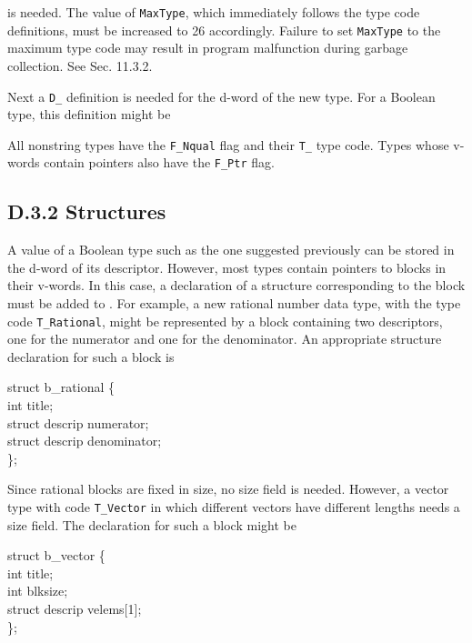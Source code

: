 \noindent is needed. The value of \texttt{MaxType}, which immediately follows
the type code definitions, must be increased to 26 accordingly.
Failure to set \texttt{MaxType} to the maximum type code may result in
program malfunction during garbage collection. See Sec. 11.3.2.

Next a \texttt{D\_} definition is needed for the d-word of the new type.
For a Boolean type, this definition might be


\noindent
All nonstring types have the \texttt{F\_Nqual} flag and their \texttt{T\_}
type code. Types whose v-words contain pointers also have the
\texttt{F\_Ptr} flag.

\subsection[D.3.2 Structures]{D.3.2 Structures}

A value of a Boolean type such as the one suggested previously can be
stored in the d-word of its descriptor. However, most types contain
pointers to blocks in their v-words. In this case, a declaration of a
structure corresponding to the block must be added to .
For example, a new rational number data type, with the type code
\texttt{T\_Rational}, might be represented by a block containing two
descriptors, one for the numerator and one for the denominator. An
appropriate structure declaration for such a block is

\goodbreak
\begin{iconcode}
struct b\_rational \{\\
\>int title;\\
\>struct descrip numerator;\\
\>struct descrip denominator;\\
\};
\end{iconcode}

Since rational blocks are fixed in size, no size field is needed. However,
a vector type with code \texttt{T\_Vector} in which different vectors have
different lengths needs a size field. The declaration for such a block
might be

\goodbreak
\begin{iconcode}
struct b\_vector \{\\
\>int title;\\
\>int blksize;\\
\>struct descrip velems[1];\\
\};
\end{iconcode}

